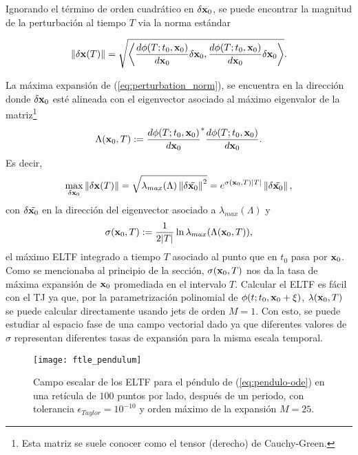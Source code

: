 Ignorando el término de orden cuadrático en $\delta \mathbf{x}_0$, se puede encontrar la magnitud de la perturbación al tiempo $T$ via la norma estándar

\begin{equation}
 \left\lVert\delta \mathbf{x}(T)\right\rVert = \sqrt{ \left\langle \frac{d \phi(T;t_0, \mathbf{x}_0)}{d\mathbf{x}_0} \delta \mathbf{x}_0, \frac{d \phi(T;t_0, \mathbf{x}_0)}{d\mathbf{x}_0} \delta \mathbf{x}_0 \right\rangle }.
 \label{eq:perturbation_norm}
\end{equation}

La máxima expansión de (\ref{eq:perturbation_norm}), se encuentra en la dirección donde $\delta \mathbf{x}_0$ esté alineada con el eigenvector asociado al máximo eigenvalor de la matriz\footnote{Esta matriz se suele conocer como el tensor (derecho) de Cauchy-Green.}
\begin{equation}
 \Lambda(\mathbf{x}_0, T) := \frac{d \phi(T;t_0, \mathbf{x}_0)}{d\mathbf{x}_0}^* \frac{d \phi(T;t_0, \mathbf{x}_0)}{d\mathbf{x}_0}.
 \label{eq:finite_cgtensor} 
\end{equation}
Es decir, 
\begin{equation*}
 \max_{\delta \mathbf{x}_0} \left\lVert\delta \mathbf{x}(T) \right\rVert = \sqrt{ \lambda_{max}(\Lambda) \left\lVert \delta \tilde{\mathbf{x}_0}\right\rVert^2 } = e^{\sigma(\mathbf{x}_0,T)\lvert T \rvert} \left\lVert \delta \tilde{\mathbf{x}_0} \right\rVert  ,
\end{equation*}
con $ \delta \tilde{\mathbf{x}_0} $ en la dirección del eigenvector asociado a $\lambda_{max}(\Lambda)$ y
\begin{equation}
 \sigma(\mathbf{x}_0,T) := \frac{1}{2 \lvert T \rvert} \ln \lambda_{max}(\Lambda(\mathbf{x}_0, T)),
 \label{eq:FTLE}
\end{equation}
el máximo ELTF integrado a tiempo $T$ asociado al punto que en $t_0$ pasa por $\mathbf{x}_0$. Como se mencionaba al principio de la sección, $\sigma(\mathbf{x}_0,T)$ nos da la tasa de máxima expansión de $\mathbf{x}_0$ promediada en el intervalo $T$. Calcular el ELTF es fácil con el TJ ya que, por la parametrización polinomial de $\phi(t;t_0,\mathbf{x}_0 + \xi)$, $\lambda(\mathbf{x}_0,T)$ se puede calcular directamente usando jets de orden $M = 1$. Con esto, se puede estudiar al espacio fase de una campo vectorial dado ya que diferentes valores de $\sigma$ representan diferentes tasas de expansión para la misma escala temporal.

\begin{figure}[h!]
 \centering
 \texttt{[image: ftle\_pendulum]}
 \caption{Campo escalar de los ELTF para el péndulo de (\ref{eq:pendulo-ode}) en una retícula de $100$ puntos por lado, después de un periodo, con tolerancia $\epsilon_{Taylor} = 10^{-10}$ y orden máximo de la expansión $M = 25$.}
 \label{fig:ftle_pendulum}
\end{figure}

